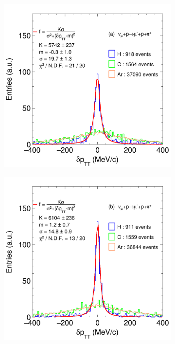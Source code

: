 \begin{figure}[t]
     \centering
     \begin{subfigure}[b]{0.48\textwidth}
         \centering
         \includegraphics[width=\textwidth]{figures/ch6-TKI/1D/GAr_dpTT_numuCC_Fit.png}
         \caption{}
         \label{fig:dpTT_GArReco}
     \end{subfigure}
     \begin{subfigure}[b]{0.48\textwidth}
         \centering
         \includegraphics[width=\textwidth]{figures/ch6-TKI/1D/ALICE_dpTT_numuCC_Fit.png}

\end{subfigure}
\end{figure}
